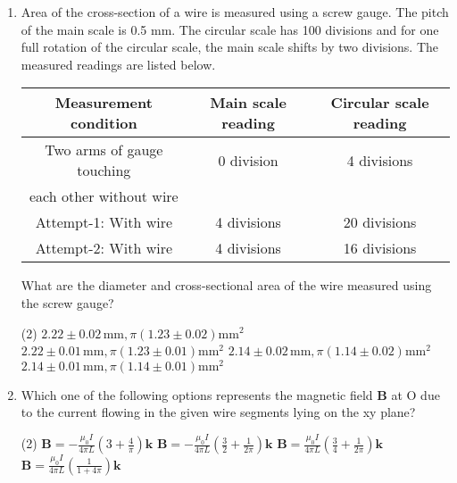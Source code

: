 \documentclass{article}
\begin{document}
\begin{enumerate}
    \item Area of the cross-section of a wire is measured using a screw gauge. The pitch of the main scale is 0.5 mm. The circular scale has 100 divisions and for one full rotation of the circular scale, the main scale shifts by two divisions. The measured readings are listed below.
    
    \begin{center}
    \begin{tabular}{|c|c|c|}
    \hline
    Measurement condition & Main scale reading & Circular scale reading \\
    \hline
    Two arms of gauge touching & 0 division & 4 divisions \\
    each other without wire & & \\
    \hline
    Attempt-1: With wire & 4 divisions & 20 divisions \\
    \hline
    Attempt-2: With wire & 4 divisions & 16 divisions \\
    \hline
    \end{tabular}
    \end{center}
    
    What are the diameter and cross-sectional area of the wire measured using the screw gauge?
    
    \begin{tasks}(2)
        \task \(2.22 \pm 0.02 \, \text{mm}, \pi(1.23 \pm 0.02)\text{mm}^2\)
        \task \(2.22 \pm 0.01 \, \text{mm}, \pi(1.23 \pm 0.01)\text{mm}^2\)
        \task \(2.14 \pm 0.02 \, \text{mm}, \pi(1.14 \pm 0.02)\text{mm}^2\)
        \task \(2.14 \pm 0.01 \, \text{mm}, \pi(1.14 \pm 0.01)\text{mm}^2\)
    \end{tasks}
    \item Which one of the following options represents the magnetic field \(\mathbf{B}\) at O due to the current flowing in the given wire segments lying on the xy plane?
    
    \begin{center}
    \end{center}
    
    \begin{tasks}(2)
        \task \(\mathbf{B} = -\frac{\mu_0 I}{4\pi L}\left(3 + \frac{4}{\pi}\right)\mathbf{k}\)
        \task \(\mathbf{B} = -\frac{\mu_0 I}{4\pi L}\left(\frac{3}{2} + \frac{1}{2\pi}\right)\mathbf{k}\)
        \task \(\mathbf{B} = \frac{\mu_0 I}{4\pi L}\left(\frac{3}{4} + \frac{1}{2\pi}\right)\mathbf{k}\)
        \task \(\mathbf{B} = \frac{\mu_0 I}{4\pi L}\left(\frac{1}{1+4\pi}\right)\mathbf{k}\)
    \end{tasks}
\end{enumerate}
\end{document}

